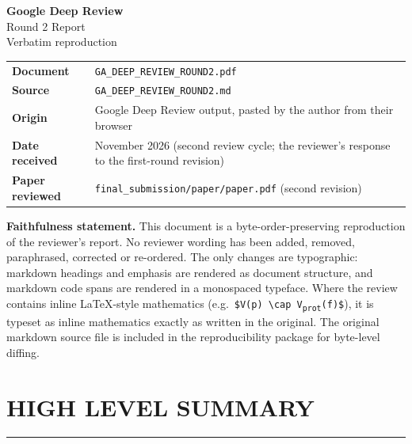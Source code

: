 \documentclass[11pt,a4paper]{article}
\begin{document}
\begin{titlepage}
\vspace*{2.8cm}
{\color{ink}\Huge\bfseries Google Deep Review\\\bigskip}
{\color{ink}\Large Round 2 Report\\\bigskip}
{\color{quote}\large Verbatim reproduction}\vspace{1.5cm}

\begin{tabular}{@{}ll@{}}
\textbf{Document} & \texttt{GA\_DEEP\_REVIEW\_ROUND2.pdf} \\
\textbf{Source} & \texttt{GA\_DEEP\_REVIEW\_ROUND2.md} \\
\textbf{Origin} & Google Deep Review output, pasted by the author from their browser \\
\textbf{Date received} & November 2026 (second review cycle; the reviewer's response to the first-round revision) \\
\textbf{Paper reviewed} & \texttt{final\_submission/paper/paper.pdf} (second revision) \\
\bottomrule
\end{tabular}

\vspace{1.0cm}
\noindent\textbf{Faithfulness statement.} This document is a byte-order-preserving
reproduction of the reviewer's report. No reviewer wording has been added, removed,
paraphrased, corrected or re-ordered. The only changes are typographic: markdown
headings and emphasis are rendered as document structure, and markdown code spans
are rendered in a monospaced typeface. Where the review contains inline LaTeX-style
mathematics (e.g.\ \texttt{\$V(p) \textbackslash cap V\textsubscript{prot}(f)\$}),
it is typeset as inline mathematics exactly as written in the original. The original
markdown source file is included in the reproducibility package for byte-level diffing.

\vfill
\end{titlepage}
\section*{HIGH LEVEL SUMMARY}
\par\medskip\noindent\rule{\linewidth}{0.4pt}\medskip\par
\end{document}
